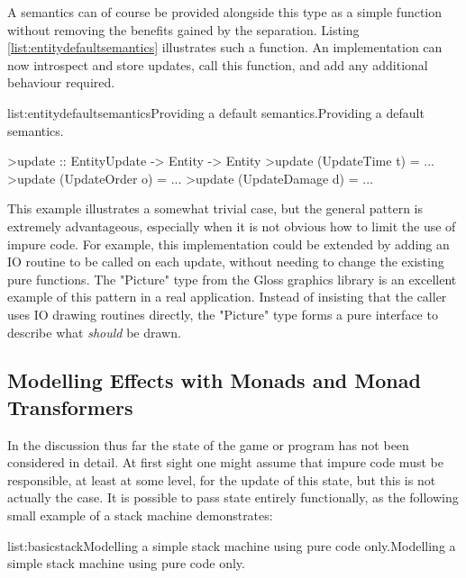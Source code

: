 A semantics can of course be provided alongside this type as a simple function without removing the benefits gained by the separation. Listing \ref{list:entitydefaultsemantics} illustrates such a function. An implementation can now introspect and store updates, call this function, and add any additional behaviour required.

\vspace{-0.5em}
\begin{listing}{list:entitydefaultsemantics}{Providing a default semantics.}{Providing a default semantics.}{}
\end{listing}\vspace{-1.5em}

\begin{haskell}

>update :: EntityUpdate -> Entity -> Entity
>update (UpdateTime t) = ...
>update (UpdateOrder o) = ...
>update (UpdateDamage d) = ...

\end{haskell}
\noindent This example illustrates a somewhat trivial case, but the general pattern is extremely advantageous, especially when it is not obvious how to limit the use of impure code. For example, this implementation could be extended by adding an IO routine to be called on each update, without needing to change the existing pure functions. 
The "Picture" type from the Gloss graphics library is an excellent example of this pattern in a real application. Instead of insisting that the caller uses IO drawing routines directly, the "Picture" type forms a pure interface to describe what \emph{should} be drawn.

\subsection[Modelling Effects with Monads and Monad Transformers]{Modelling Effects with Monads and Monad \\Transformers}

In the discussion thus far the state of the game or program has not been considered in detail. At first sight one might assume that impure code must be responsible, at least at some level, for the update of this state, but this is not actually the case. It is possible to pass state entirely functionally, as the following small example of a stack machine demonstrates:

\vspace{-0.5em}
\begin{listing}{list:basicstack}{Modelling a simple stack machine using pure code only.}{Modelling a simple stack machine using pure code only.}{}
\end{listing}\vspace{-1.5em}

